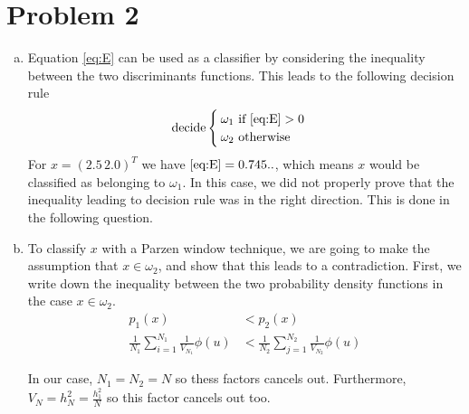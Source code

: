 \documentclass[a4paper, 10pt, twoside]{article}
\begin{document}
\section*{Problem 2}
\begin{enumerate}[a)]
    \item Equation \eqref{eq:E} can be used as a classifier by considering the inequality between the two discriminants functions. This leads to the following decision rule
          \begin{align*}
              \text{decide}
              \begin{cases}
                  \omega_1 \text{ if \eqref{eq:E}} > 0 \\
                  \omega_2 \text{ otherwise}
              \end{cases}
          \end{align*}
          For $x = (2.5 \, 2.0)^T$ we have $\eqref{eq:E} = 0.745..$, which means $x$ would be classified as belonging to $\omega_1$. In this case, we did not properly prove that the inequality leading to decision rule was in the right direction. This is done in the following question.
    \item
          To classify $x$ with a Parzen window technique, we are going to make the assumption that $x \in \omega_2$, and show that this leads to a contradiction. First, we write down the inequality between the two probability density functions in the case $x \in \omega_2$.
          \begin{align*}
              p_1(x)                                                & < p_2(x)                                                \\
              \frac{1}{N_1}\sum_{i=1}^{N_1}\frac{1}{V_{N_1}}\phi(u) & < \frac{1}{N_2}\sum_{j=1}^{N_2}\frac{1}{V_{N_2}}\phi(u)
          \end{align*}

          In our case, $N_1=N_2=N$ so thess factors cancels out. Furthermore, $V_N = h_N^2 = \frac{h_1^2}{N}$ so this factor cancels out too.


\end{enumerate}
\end{document}
